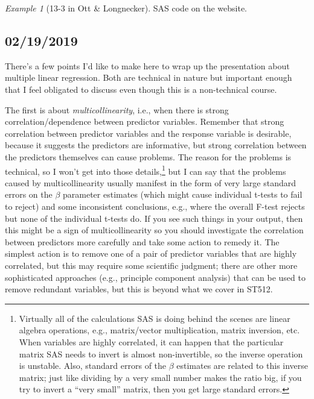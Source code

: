 \documentclass[a4paper, 12pt]{article}
\theoremstyle{plain}
\theoremstyle{definition}
\theoremstyle{remark}
\newtheorem*{example}{Example}
\begin{document}
\begin{example}[13-3 in Ott \& Longnecker]
SAS code on the website.
\end{example}



\subsection*{02/19/2019}

There's a few points I'd like to make here to wrap up the presentation about multiple linear regression.  Both are technical in nature but important enough that I feel obligated to discuss even though this is a non-technical course.  

The first is about {\em multicollinearity}, i.e., when there is strong correlation/dependence between predictor variables.  Remember that strong correlation between predictor variables and the response variable is desirable, because it suggests the predictors are informative, but strong correlation between the predictors themselves can cause problems.  The reason for the problems is technical, so I won't get into those details,\footnote{Virtually all of the calculations SAS is doing behind the scenes are linear algebra operations, e.g., matrix/vector multiplication, matrix inversion, etc.  When variables are highly correlated, it can happen that the particular matrix SAS needs to invert is almost non-invertible, so the inverse operation is unstable.  Also, standard errors of the $\beta$ estimates are related to this inverse matrix; just like dividing by a very small number makes the ratio big, if you try to invert a ``very small'' matrix, then you get large standard errors.} but I can say that the problems caused by multicollinearity usually manifest in the form of very large standard errors on the $\beta$ parameter estimates (which might cause individual t-tests to fail to reject) and some inconsistent conclusions, e.g., where the overall F-test rejects but none of the individual t-tests do.  If you see such things in your output, then this might be a sign of multicollinearity so you should investigate the correlation between predictors more carefully and take some action to remedy it.  The simplest action is to remove one of a pair of predictor variables that are highly correlated, but this may require some scientific judgment; there are other more sophisticated approaches (e.g., principle component analysis) that can be used to remove redundant variables, but this is beyond what we cover in ST512.  
\end{document}
